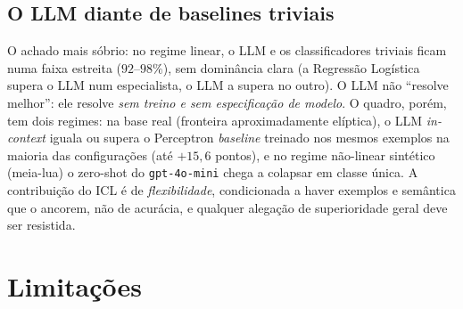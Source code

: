 \documentclass[12pt,a4paper]{article}
\begin{document}
\subsection{O LLM diante de baselines triviais}
O achado mais sóbrio: no regime linear, o LLM e os classificadores triviais ficam numa
faixa estreita ($92$–$98\%$), sem dominância clara (a Regressão Logística supera o LLM num
especialista, o LLM a supera no outro). O LLM não ``resolve melhor'': ele resolve \emph{sem
treino e sem especificação de modelo}. O quadro, porém, tem dois regimes: na base real
(fronteira aproximadamente elíptica), o LLM \emph{in-context} iguala ou supera o Perceptron
\emph{baseline} treinado nos mesmos exemplos na maioria das configurações (até $+15{,}6$
pontos), e no regime não-linear sintético (meia-lua) o zero-shot do \texttt{gpt-4o-mini}
chega a colapsar em classe única. A contribuição do ICL é de \emph{flexibilidade},
condicionada a haver exemplos e semântica que o ancorem, não de acurácia, e qualquer
alegação de superioridade geral deve ser resistida.

\section{Limitações}
\label{sec:limitacoes}
\end{document}
